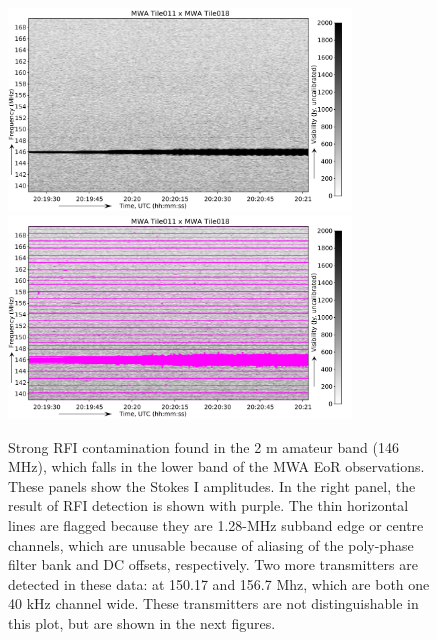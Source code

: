 \documentclass[useAMS,usenatbib]{mn2e}
\begin{document}
\noindent\begin{figure}
\begin{center}\hspace*{-0.2cm}\includegraphics[width=9.1cm]{img/amateur-2m-band-example}\includegraphics[width=9.1cm]{img/amateur-2m-band-flagged}
\caption{Strong RFI contamination found in the 2 m amateur band (146 MHz), which falls in the lower band of the MWA EoR observations. These panels show the Stokes I amplitudes. In the right panel, the result of RFI detection is shown with purple. The thin horizontal lines are flagged because they are 1.28-MHz subband edge or centre channels, which are unusable because of aliasing of the poly-phase filter bank and DC offsets, respectively. Two more transmitters are detected in these data: at 150.17 and 156.7 Mhz, which are both one 40 kHz channel wide. These transmitters are not distinguishable in this plot, but are shown in the next figures.}
\label{fig:amateur-2m}
\end{center}
\end{figure}
\end{document}
